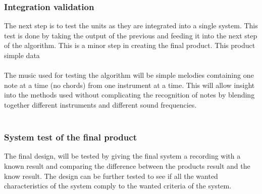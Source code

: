 
\subsubsection{Integration validation}
The next step is to test the units as they are integrated into a single system.
This test is done by taking the output of the previous and feeding it into the next step of the algorithm. 
This is a minor step in creating the final product.
This product 
simple data 
\\\\
The music used for testing the algorithm will be simple melodies comtaining one note at a time (no chords) from one instrument at a time. This will allow insight into the methods used without complicating the recognition of notes by blending together different instruments and different sound frequencies.\\\\

\subsubsection{System test of the final product}
The final design, will be tested by giving the final system a recording with a known result and comparing the difference between the products result and the know result. The design can be further tested to see if all the wanted characteristics of the system comply to the wanted criteria of the system.


